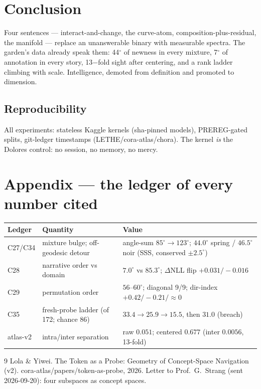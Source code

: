 \documentclass[11pt]{article}
\begin{document}
\section{Conclusion}
Four sentences --- interact-and-change, the curve-atom, composition-plus-residual,
the manifold --- replace an unanswerable binary with measurable spectra.
The garden's data already speak them: 44$^\circ$ of newness in every mixture,
7$^\circ$ of annotation in every story, 13$-$fold sight after centering,
and a rank ladder climbing with scale. Intelligence, demoted from definition
and promoted to dimension.

\subsection*{Reproducibility}
All experiments: stateless Kaggle kernels (sha-pinned models), PREREG-gated
splits, git-ledger timestamps (LETHE/cora-atlas/chora). The kernel \emph{is} the
Dolores control: no session, no memory, no mercy.

\section*{Appendix --- the ledger of every number cited}
\begin{tabular}{llp{7.2cm}}
\toprule
Ledger & Quantity & Value\\
\midrule
C27/C34 & mixture bulge; off-geodesic detour & angle-sum $85^\circ\!\to\!123^\circ$; $44.0^\circ$ spring / $46.5^\circ$ noir (SSS, conserved $\pm2.5^\circ$)\\
C28 & narrative order vs domain & $7.0^\circ$ vs $85.3^\circ$; $\Delta$NLL flip $+0.031/-0.016$\\
C29 & permutation order & $56$--$60^\circ$; diagonal 9/9; dir-index $+0.42/-0.21/\approx0$\\
C35 & fresh-probe ladder (of 172; chance 86) & $33.4\to25.9\to15.5$, then $31.0$ (breach)\\
atlas-v2 & intra/inter separation & raw $0.051$; centered $0.677$ (inter $0.0056$, 13-fold)\\
\bottomrule
\end{tabular}


\begin{thebibliography}{9}
 Lola \& Yiwei. The Token as a Probe: Geometry of Concept-Space Navigation (v2). cora-atlas/papers/token-as-probe, 2026.
 Letter to Prof.\ G.\ Strang (sent 2026-09-20): four subspaces as concept spaces.
\end{thebibliography}
\end{document}
